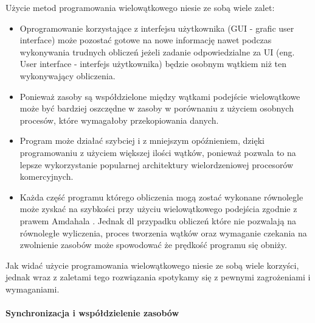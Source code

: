 Użycie metod programowania wielowątkowego niesie ze sobą wiele zalet:
\begin{itemize}
        \item Oprogramowanie korzystające z interfejsu użytkownika (GUI - grafic user interface) może pozostać gotowe na nowe informację nawet podczas wykonywania trudnych obliczeń jeżeli zadanie odpowiedzialne za UI (eng. User interface - interfejs użytkownika) będzie osobnym wątkiem niż ten wykonywający obliczenia.
        \item Ponieważ zasoby są współdzielone między wątkami podejście wielowątkowe może być bardziej oszczędne w zasoby w porównaniu z użyciem osobnych procesów, które wymagałoby przekopiowania danych.
        \item Program może działać szybciej i z mniejszym opóźnieniem, dzięki programowaniu z użyciem większej ilości wątków, ponieważ pozwala to na lepsze wykorzystanie popularnej architektury wielordzeniowej procesorów komercyjnych. 
        \item Każda część programu którego obliczenia mogą zostać wykonane równolegle może zyskać na szybkości przy użyciu wielowątkowego podejścia zgodnie z prawem Amdahala \cite{arch}. 
        Jednak dl przypadku obliczeń które nie pozwalają na równoległe wyliczenia, proces tworzenia wątków oraz wymaganie czekania na zwolnienie zasobów może spowodować że prędkość programu się obniży.
\end{itemize}
Jak widać użycie programowania wielowątkowego niesie ze sobą wiele korzyści,
jednak wraz z zaletami tego rozwiązania spotykamy się z pewnymi zagrożeniami i wymaganiami.

\paragraph{Synchronizacja i współdzielenie zasobów}

